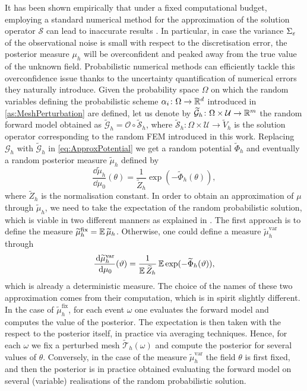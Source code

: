 It has been shown empirically that under a fixed computational budget, employing a standard numerical method for the approximation of the solution operator $\mathcal S$ can lead to inaccurate results \cite{AbG20, CGS17, COS17}. In particular, in case the variance $\Sigma_\varepsilon$ of the observational noise is small with respect to the discretisation error, the posterior measure $\mu_h$ will be overconfident and peaked away from the true value of the unknown field. Probabilistic numerical methods can efficiently tackle this overconfidence issue thanks to the uncertainty quantification of numerical errors they naturally introduce. Given the probability space $\Omega$ on which the random variables defining the probabilistic scheme $\alpha_i \colon \Omega \to \mathbb{R}^d$ introduced in \cref{as:MeshPerturbation} are defined, let us denote by $\widetilde{\mathcal G}_h \colon \Omega \times \mathcal U \to \mathbb{R}^m$ the random forward model obtained as $\widetilde{\mathcal G}_h = \mathcal O \circ \widetilde{\mathcal S}_h$, where $\widetilde{\mathcal S}_h \colon \Omega \times \mathcal U \to \widetilde V_h$ is the solution operator corresponding to the random FEM introduced in this work. Replacing $\mathcal G_h$ with $\widetilde{\mathcal G}_h$ in \eqref{eq:ApproxPotential} we get a random potential $\widetilde \Phi_h$ and eventually a random posterior measure $\tilde \mu_h$ defined by
\begin{equation}
	\frac{\dd \tilde \mu_h}{\dd \mu_0}(\theta) = \frac{1}{\widetilde Z_h}\exp(-\widetilde \Phi_h(\theta)),
\end{equation}
where $\widetilde Z_h$ is the normalisation constant. In order to obtain an approximation of $\mu$ through $\tilde \mu_h$, we need to take the expectation of the random probabilistic solution, which is viable in two different manners as explained in \cite{LST18}. The first approach is to define the measure $\widetilde \mu_h^{\mathrm{fix}} = \operatorname{\mathbb{E}} \widetilde \mu_h$. Otherwise, one could define a measure $\tilde \mu_h^{\mathrm{var}}$ through
\begin{equation}
	\frac{\,\mathrm{d} \widetilde \mu_h^{\mathrm{var}}}{\,\mathrm{d} \mu_0}(\vartheta) = \frac{1}{\operatorname{\mathbb{E}} \widetilde Z_h} \operatorname{\mathbb{E}} \exp(-\widetilde \Phi_h(\vartheta)),
\end{equation}
which is already a deterministic measure. The choice of the names of these two approximation comes from their computation, which is in spirit slightly different. In the case of $\tilde \mu_h^{\mathrm{fix}}$, for each event $\omega$ one evaluates the forward model and computes the value of the posterior. The expectation is then taken with the respect to the posterior itself, in practice via averaging techniques. Hence, for each $\omega$ we fix a perturbed mesh $\widetilde {\mathcal T}_h(\omega)$ and compute the posterior for several values of $\theta$. Conversely, in the case of the measure $\tilde \mu_h^{\mathrm{var}}$ the field $\theta$ is first fixed, and then the posterior is in practice obtained evaluating the forward model on several (variable) realisations of the random probabilistic solution.

